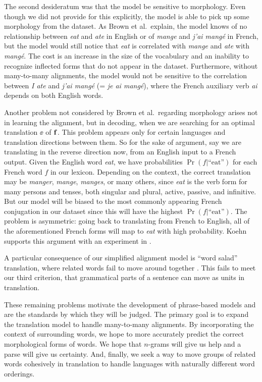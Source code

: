 \documentclass[11pt]{article}
\begin{document}
The second desideratum was that the model be sensitive to morphology. 
Even though we did not provide for this explicitly, the model is able to pick up some morphology
from the dataset. As Brown et al.\ explain, the model knows of no relationship
between \textit{eat} and \textit{ate} in English or of \textit{mange} and \textit{j'ai mang\'{e}} in French, 
but the model would still notice that \textit{eat} is correlated with \textit{mange} and
\textit{ate} with \textit{mang\'{e}}.
The cost is an increase in the size of the vocabulary
and an inability to recognize inflected forms that do not appear in the dataset.
Furthermore, without many-to-many alignments, the model would not be sensitive to the correlation
between \textit{I ate} and \textit{j'ai mang\'{e}} (= \textit{je ai mang\'{e}}), where the French auxiliary verb
\textit{ai} depends on both English words.

Another problem not considered by Brown et al.\ regarding morphology arises not in learning the alignment,
but in decoding, when we are searching for an optimal translation $\ee$ of $\mathbf{f}$.
This problem appears only for certain languages and translation directions between them.
So for the sake of argument, say we are translating in the reverse direction now, from an English input to a French output.
Given the English word \textit{eat}, we have probabilities $\Pr(f | \text{``eat''})$ for each French word $f$ in our lexicon.
Depending on the context, the correct translation may be \textit{manger}, \textit{mange}, \textit{manges}, or many others, since
\textit{eat} is the verb form for many persons and tenses, both singular and plural, active, passive, and infinitive. 
But our model will be biased to the most commonly appearing French conjugation in our dataset since this will
have the highest $\Pr(f | \text{``eat''})$. The problem is asymmetric: going back to translating
from French to English, all of the aforementioned French forms will map to \textit{eat} with high probability.
Koehn supports this argument with an experiment in \cite{europarl}.

A particular consequence of our simplified alignment model is
``word salad'' translation, where related words fail to move around together \cite{lopez}.
This fails to meet our third criterion, that grammatical parts of a sentence can move
as units in translation.

These remaining problems motivate the development of phrase-based models and
are the standards by which they will be judged.
The primary goal is to expand the translation model to handle many-to-many alignments.
By incorporating the context of surrounding words, we hope to more accurately predict the 
correct morphological forms of words. 
We hope that $n$-grams will give us help and a parse will give us certainty.
And, finally, we seek a way to move groups of related words cohesively in translation
to handle languages with naturally different word orderings.
\end{document}
